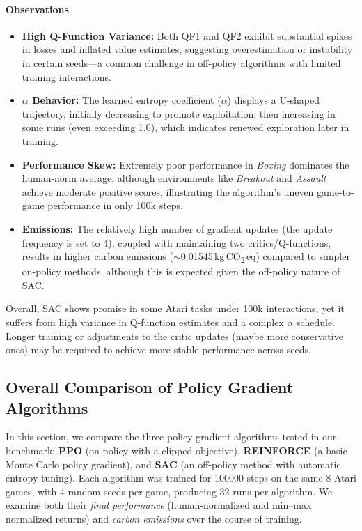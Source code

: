 \paragraph{Observations}
\begin{itemize}
	\item \textbf{High Q-Function Variance:} Both QF1 and QF2 exhibit substantial spikes in losses and inflated value estimates, suggesting overestimation or instability in certain seeds—a common challenge in off-policy algorithms with limited training interactions.
	\item \textbf{$\alpha$ Behavior:} The learned entropy coefficient ($\alpha$) displays a U-shaped trajectory, initially decreasing to promote exploitation, then increasing in some runs (even exceeding 1.0), which indicates renewed exploration later in training.
	\item \textbf{Performance Skew:} Extremely poor performance in \emph{Boxing} dominates the human‐norm average, although environments like \emph{Breakout} and \emph{Assault} achieve moderate positive scores, illustrating the algorithm's uneven game-to-game performance in only 100k steps.
	\item \textbf{Emissions:} The relatively high number of gradient updates (the update frequency is set to 4), coupled with maintaining two critics/Q-functions, results in higher carbon emissions ($\sim$\num{0.01545}\,kg\,CO\textsubscript{2}\,eq) compared to simpler on-policy methods, although this is expected given the off-policy nature of SAC.
\end{itemize}

Overall, SAC shows promise in some Atari tasks under 100k interactions, yet it suffers from high variance in Q-function estimates and a complex $\alpha$ schedule. Longer training or adjustments to the critic updates (maybe more conservative ones) may be required to achieve more stable performance across seeds.

\subsection{Overall Comparison of Policy Gradient Algorithms}
\label{subsec:policy_comparison}
In this section, we compare the three policy gradient algorithms tested in our benchmark: \textbf{PPO} (on-policy with a clipped objective), \textbf{REINFORCE} (a basic Monte Carlo policy gradient), and \textbf{SAC} (an off-policy method with automatic entropy tuning). Each algorithm was trained for \num{100000} steps on the same 8 Atari games, with 4 random seeds per game, producing 32 runs per algorithm. We examine both their \emph{final performance} (human‐normalized and min–max normalized returns) and \emph{carbon emissions} over the course of training.

